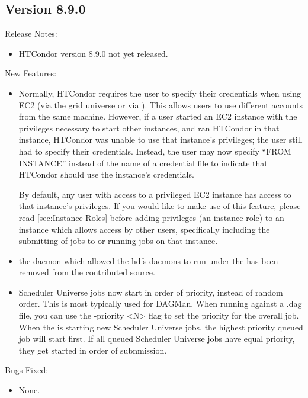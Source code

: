 \subsection*{\label{sec:New-8-9-0}Version 8.9.0}

\noindent Release Notes:

\begin{itemize}

\item HTCondor version 8.9.0 not yet released.

\end{itemize}


\noindent New Features:

\begin{itemize}

\item  Normally, HTCondor requires the user to specify their credentials
when using EC2 (via the grid universe or via ).  This allows
users to use different accounts from the same machine.  However,
if a user started an EC2 instance with the privileges necessary to start
other instances, and ran HTCondor in that instance, HTCondor was unable to
use that instance's privileges; the user still had to specify their
credentials.  Instead, the user may now specify ``FROM INSTANCE'' instead
of the name of a credential file to indicate that HTCondor should use the
instance's credentials.

By default, any user with access to a privileged EC2 instance has access to
that instance's privileges.  If you would like to make use of this feature,
please read \ref{sec:Instance Roles} before adding privileges (an instance
role) to an instance which allows access by other users, specifically
including the submitting of jobs to or running jobs on that instance.

\item the  daemon which allowed the hdfs daemons to run under
the  has been removed from the contributed source. 

\item Scheduler Universe jobs now start in order of priority, instead of random 
order. This is most typically used for DAGMan. When running 
against a .dag file, you can use the -priority <N> flag to set the priority
for the overall  job. When the  is starting new 
Scheduler Universe jobs, the highest priority queued job will start first. If 
all queued Scheduler Universe jobs have equal priority, they get started in 
order of subnmission.

\end{itemize}

\noindent Bugs Fixed:

\begin{itemize}

\item None.

\end{itemize}

